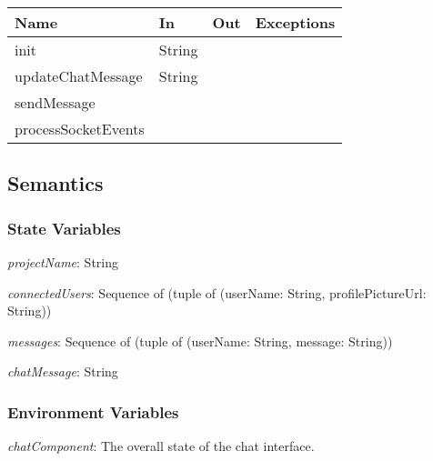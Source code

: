 \documentclass[12pt, titlepage]{article}
\begin{document}
	\begin{center}
		\begin{tabular}{l  l  l  l}
			\hline
			\textbf{Name} & \textbf{In} & \textbf{Out} & \textbf{Exceptions} \\
			\hline
			init & String & & \\
			updateChatMessage & String & & \\
			sendMessage & & & \\
			processSocketEvents & & & \\
			\hline
		\end{tabular}
	\end{center}
	
	\subsection{Semantics}
	
	\subsubsection{State Variables}
	
	\textit{projectName}: String
	
	\noindent \textit{connectedUsers}: Sequence of (tuple of (userName: String, profilePictureUrl: String))
	
	\noindent \textit{messages}: Sequence of (tuple of (userName: String, message: String))
	
	\noindent \textit{chatMessage}: String
	
	\subsubsection{Environment Variables}
	
	\noindent \textit{chatComponent}: The overall state of the chat interface.\\
	
	
\end{document}
